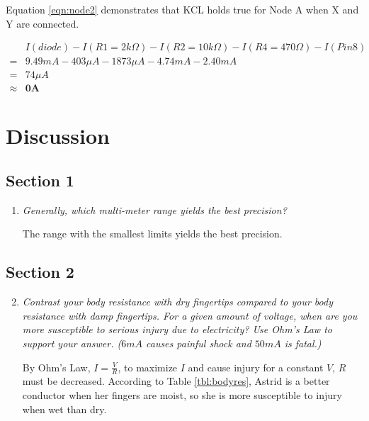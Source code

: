 \documentclass[12pt]{article}
\begin{document}
\begin{enumerate}[a)]
        Equation \ref{eqn:node2} demonstrates that KCL holds true for Node A when X and Y are connected.

        \begin{equation} 
            \label{eqn:node2}
            \begin{split}
                & I(diode) - I(R1 = 2k\Omega) - I(R2 = 10k\Omega) - I(R4 = 470\Omega) - I(Pin 8) \\
                = & 9.49mA - 403 \mu A - 1873 \mu A - 4.74mA - 2.40mA \\
                = & 74\mu A \\
                \approx & \textbf{0A}
            \end{split}
        \end{equation} 
\end{enumerate}


\section*{Discussion}

\subsection*{Section 1}

\begin{enumerate}
    \item {
        \textit{Generally, which multi-meter range yields the best precision?}
        
        The range with the smallest limits yields the best precision.
    } 
\end{enumerate}

\subsection*{Section 2}

\begin{enumerate}
    \setcounter{enumi}{1}
    \item {
        \textit{Contrast your body resistance with dry fingertips compared to your body resistance
        with damp fingertips. For a given amount of voltage, when are you more susceptible to serious
        injury due to electricity? Use Ohm's Law to support your answer. ($6mA$ causes painful shock 
        and $50mA$ is fatal.)}

        By Ohm's Law, $I = \frac{V}{R}$, to maximize $I$ and cause injury for a constant $V$, $R$ 
        must be decreased. According to Table \ref{tbl:bodyres}, Astrid is a better conductor 
        when her fingers are moist, so she is more susceptible to injury when wet than dry.
    }
\end{enumerate}
\end{document}
